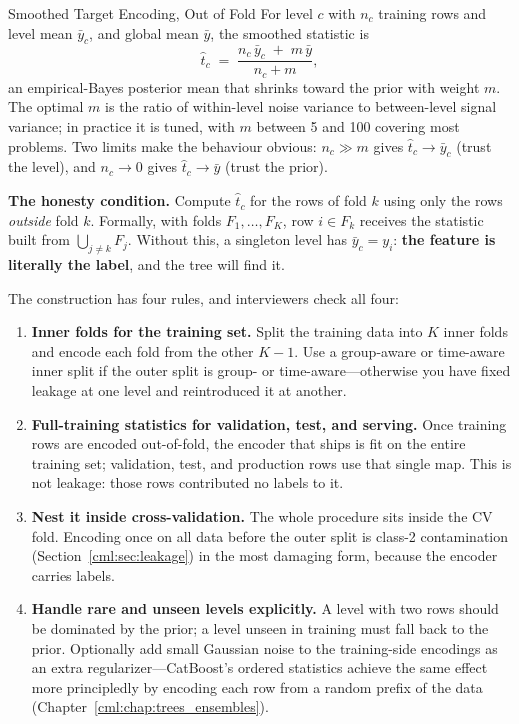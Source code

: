 \begin{mathresult}{Smoothed Target Encoding, Out of Fold}
For level $c$ with $n_c$ training rows and level mean $\bar y_c$, and global mean $\bar y$, the smoothed statistic is
\begin{equation}
\hat t_c \;=\; \frac{n_c\,\bar y_c \;+\; m\,\bar y}{n_c + m},
\end{equation}
an empirical-Bayes posterior mean that shrinks toward the prior with weight $m$. The optimal $m$ is the ratio of within-level noise variance to between-level signal variance; in practice it is tuned, with $m$ between 5 and 100 covering most problems. Two limits make the behaviour obvious: $n_c \gg m$ gives $\hat t_c \to \bar y_c$ (trust the level), and $n_c \to 0$ gives $\hat t_c \to \bar y$ (trust the prior).

\textbf{The honesty condition.} Compute $\hat t_c$ for the rows of fold $k$ using only the rows \emph{outside} fold $k$. Formally, with folds $F_1,\dots,F_K$, row $i \in F_k$ receives the statistic built from $\bigcup_{j \neq k} F_j$. Without this, a singleton level has $\bar y_c = y_i$: \textbf{the feature is literally the label}, and the tree will find it.
\end{mathresult}

The construction has four rules, and interviewers check all four:

\begin{enumerate}
    \item \textbf{Inner folds for the training set.} Split the training data into $K$ inner folds and encode each fold from the other $K-1$. Use a group-aware or time-aware inner split if the outer split is group- or time-aware---otherwise you have fixed leakage at one level and reintroduced it at another.
    \item \textbf{Full-training statistics for validation, test, and serving.} Once training rows are encoded out-of-fold, the encoder that ships is fit on the entire training set; validation, test, and production rows use that single map. This is not leakage: those rows contributed no labels to it.
    \item \textbf{Nest it inside cross-validation.} The whole procedure sits inside the CV fold. Encoding once on all data before the outer split is class-2 contamination (Section~\ref{cml:sec:leakage}) in the most damaging form, because the encoder carries labels.
    \item \textbf{Handle rare and unseen levels explicitly.} A level with two rows should be dominated by the prior; a level unseen in training must fall back to the prior. Optionally add small Gaussian noise to the training-side encodings as an extra regularizer---CatBoost's ordered statistics achieve the same effect more principledly by encoding each row from a random prefix of the data (Chapter~\ref{cml:chap:trees_ensembles}).
\end{enumerate}

